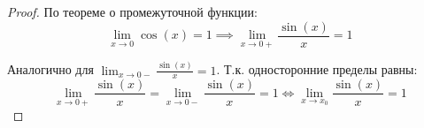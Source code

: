 \begin{proof}
   По теореме о промежуточной функции: \[
    \lim_{x \to 0} \cos(x) = 1 \implies \lim_{x \to 0+} \frac{\sin(x)}{x} = 1 
   \] 

   Аналогично для $\lim_{x \to 0-} \frac{\sin(x)}{x} = 1$. Т.к. односторонние пределы равны: \[
   \lim_{x \to 0+} \frac{\sin(x)}{x} = \lim_{x \to 0-} \frac{\sin(x)}{x} = 1 \iff \lim_{x \to x_0} \frac{\sin(x)}{x} = 1
   \] 
\end{proof}

